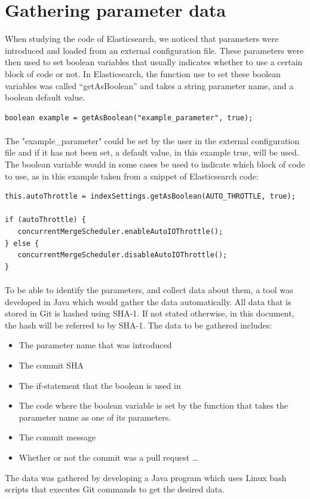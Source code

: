 \section{Gathering parameter data}
When studying the code of Elasticsearch, we noticed that parameters were introduced and loaded from an external configuration file. These parameters were then used to set boolean variables that usually indicates whether to use a certain block of code or not. In Elasticsearch, the function use to set these boolean variables was called “getAsBoolean” and takes a string parameter name, and a boolean default value.\\
\lstset{language=Java}
\begin{lstlisting}[frame=single]
boolean example = getAsBoolean("example_parameter", true);
\end{lstlisting}
\paragraph*{}
The "example\_parameter" could be set by the user in the external configuration file and if it has not been set, a default value, in this example true, will be used. The boolean variable would in some cases be used to indicate which block of code to use, as in this example taken from a snippet of Elasticsearch code:\\
\lstset{language=Java}
\begin{lstlisting}[frame=single]
this.autoThrottle = indexSettings.getAsBoolean(AUTO_THROTTLE, true);

if (autoThrottle) {
   concurrentMergeScheduler.enableAutoIOThrottle();
} else {
   concurrentMergeScheduler.disableAutoIOThrottle();
}
\end{lstlisting}
\paragraph*{}
To be able to identify the parameters, and collect data about them, a tool was developed in Java which would gather the data automatically. All data that is stored in Git is hashed using SHA-1. If not stated otherwise, in this document, the hash will be referred to by SHA-1. The data to be gathered includes:
\begin{itemize}
\item The parameter name that was introduced
\item The commit SHA
\item The if-statement that the boolean is used in
\item The code where the boolean variable is set by the function that takes the parameter name as one of its parameters.
\item The commit message
\item Whether or not the commit was a pull request \ldots
\end{itemize}
The data was gathered by developing a Java program which uses Linux bash scripts that executes Git commands to get the desired data.
